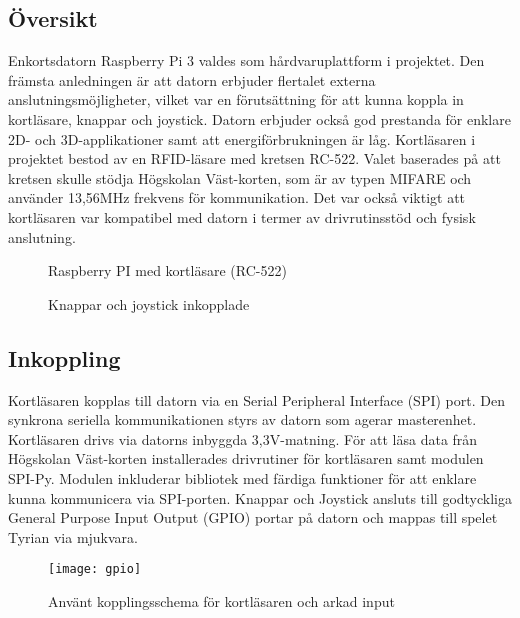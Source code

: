 \documentclass[12pt,fleqn,openany]{book} %
\begin{document}
\subsection{Översikt}
Enkortsdatorn Raspberry Pi 3 valdes som hårdvaruplattform i projektet. Den främsta anledningen är att datorn erbjuder flertalet
externa anslutningsmöjligheter, vilket var en förutsättning för att kunna koppla in kortläsare, knappar och joystick. Datorn 
erbjuder också god prestanda för enklare 2D- och 3D-applikationer samt att energiförbrukningen är låg. Kortläsaren i projektet 
bestod av en RFID-läsare med kretsen RC-522. Valet baserades på att kretsen skulle stödja Högskolan Väst-korten, som är av typen 
MIFARE och använder 13,56MHz frekvens för kommunikation. Det var också viktigt att kortläsaren var kompatibel med datorn i termer 
av drivrutinsstöd och fysisk anslutning.

\begin{figure}[!htb]
  \begin{minipage}{0.48\textwidth}
    \centering
    \caption{Raspberry PI med kortläsare (RC-522)}
    \label{fig_pirfid}
  \end{minipage}\hfill
  \begin{minipage}{0.48\textwidth}
    \centering
    \caption{Knappar och joystick inkopplade}
    \label{fig_knappar}
  \end{minipage}\hfill
\end{figure}

\subsection{Inkoppling}
Kortläsaren kopplas till datorn via en Serial Peripheral Interface (SPI) port. Den synkrona seriella kommunikationen styrs av 
datorn som agerar masterenhet. Kortläsaren drivs via datorns inbyggda 3,3V-matning. För att läsa data från Högskolan Väst-korten 
installerades drivrutiner för kortläsaren samt modulen SPI-Py. Modulen inkluderar bibliotek med färdiga funktioner för att enklare 
kunna kommunicera via SPI-porten. Knappar och Joystick ansluts till godtyckliga General Purpose Input Output (GPIO) portar på datorn 
och mappas till spelet Tyrian via mjukvara.

\begin{figure}[h]
\centering\texttt{[image: gpio]}
\caption{Använt kopplingsschema för kortläsaren och arkad input}
\label{fig_gpio}
\end{figure}
\end{document}
